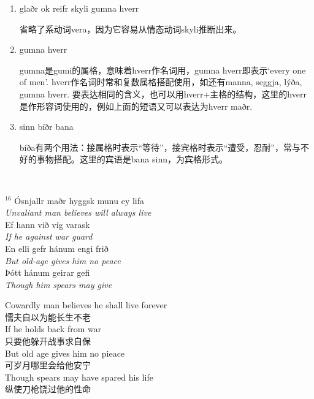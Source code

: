 \begin{grammar*}{}
    \begin{enumerate}[leftmargin=*]
        \item glaðr ok reifr skyli gumna hverr

              省略了系动词vera，因为它容易从情态动词skyli推断出来。

        \item gumna hverr

              gumna是gumi的属格，意味着hverr作名词用，gumna hverr即表示`every one of men'. hverr作名词时常和复数属格搭配使用，如还有manna, seggja, lýða, gumna hverr. 要表达相同的含义，也可以用hverr+主格的结构，这里的hverr是作形容词使用的，例如上面的短语又可以表达为hverr maðr.

        \item sinn bíðr bana

              bíða有两个用法：接属格时表示“等待”，接宾格时表示“遭受，忍耐”，常与不好的事物搭配。这里的宾语是bana sinn，为宾格形式。

    \end{enumerate}
\end{grammar*}
\hspace*{\fill}\\ %
\begin{paracol}{2}
    \noindent
    $^{16}$ Ósnjallr maðr hyggsk munu ey lifa\\
    \textit{Unvaliant man believes will always live}\\
    Ef hann við víg varask\\
    \textit{If he against war guard}\\
    En elli gefr hánum engi frið\\
    \textit{But old-age gives him no peace}\\
    \MakeUppercase þótt hánum geirar gefi\\
    \textit{Though him spears may give}\\
    \switchcolumn

    \noindent
    Cowardly man believes he shall live forever\\
    懦夫自以为能长生不老\\
    If he holds back from war\\
    只要他躲开战事求自保\\
    But old age gives him no pieace\\
    可岁月哪里会给他安宁\\
    Though spears may have spared his life\\
    纵使刀枪饶过他的性命\\

\end{paracol}

